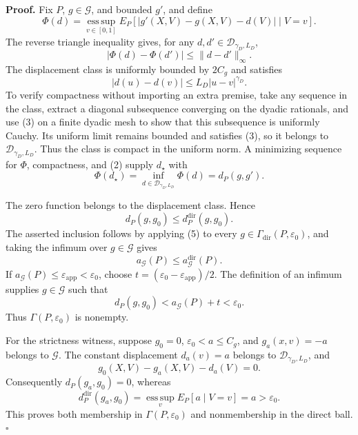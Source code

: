 \textbf{Proof.}
Fix \(P\), \(g\in\mathcal G\), and bounded \(g'\), and define
\[
 \Phi(d)=\operatorname*{ess\,sup}_{v\in[0,1]}
 E_P\!\left[|g'(X,V)-g(X,V)-d(V)|\mid V=v\right]. \tag{1}
\]
The reverse triangle inequality gives, for any \(d,d'\in\mathcal D_{\gamma_D,L_D}\),
\[
 |\Phi(d)-\Phi(d')|\le\|d-d'\|_\infty. \tag{2}
\]
The displacement class is uniformly bounded by \(2C_g\) and satisfies
\[
 |d(u)-d(v)|\le L_D|u-v|^{\gamma_D}. \tag{3}
\]
To verify compactness without importing an extra premise, take any sequence in the class, extract a diagonal subsequence converging on the dyadic rationals, and use (3) on a finite dyadic mesh to show that this subsequence is uniformly Cauchy.  Its uniform limit remains bounded and satisfies (3), so it belongs to \(\mathcal D_{\gamma_D,L_D}\).  Thus the class is compact in the uniform norm.  A minimizing sequence for \(\Phi\), compactness, and (2) supply \(d_\star\) with
\[
 \Phi(d_\star)=\inf_{d\in\mathcal D_{\gamma_D,L_D}}\Phi(d)=d_P(g,g'). \tag{4}
\]

The zero function belongs to the displacement class.  Hence
\[
 d_P(g,g_0)\le d_P^{\mathrm{dir}}(g,g_0). \tag{5}
\]
The asserted inclusion follows by applying (5) to every \(g\in\Gamma_{\mathrm{dir}}(P,\varepsilon_0)\), and taking the infimum over \(g\in\mathcal G\) gives
\[
 a_{\mathcal G}(P)\le a_{\mathcal G}^{\mathrm{dir}}(P). \tag{6}
\]
If \(a_{\mathcal G}(P)\le\varepsilon_{\mathrm{app}}<\varepsilon_0\), choose
\(t=(\varepsilon_0-\varepsilon_{\mathrm{app}})/2\).  The definition of an infimum supplies \(g\in\mathcal G\) such that
\[
 d_P(g,g_0)<a_{\mathcal G}(P)+t<\varepsilon_0. \tag{7}
\]
Thus \(\Gamma(P,\varepsilon_0)\) is nonempty.

For the strictness witness, suppose \(g_0=0\), \(\varepsilon_0<a\le C_g\), and \(g_a(x,v)=-a\) belongs to \(\mathcal G\).  The constant displacement \(d_a(v)=a\) belongs to \(\mathcal D_{\gamma_D,L_D}\), and
\[
 g_0(X,V)-g_a(X,V)-d_a(V)=0.
\]
Consequently \(d_P(g_a,g_0)=0\), whereas
\[
 d_P^{\mathrm{dir}}(g_a,g_0)
 =\operatorname*{ess\,sup}_{v}E_P[a\mid V=v]=a>\varepsilon_0. \tag{8}
\]
This proves both membership in \(\Gamma(P,\varepsilon_0)\) and nonmembership in the direct ball. \(\square\)